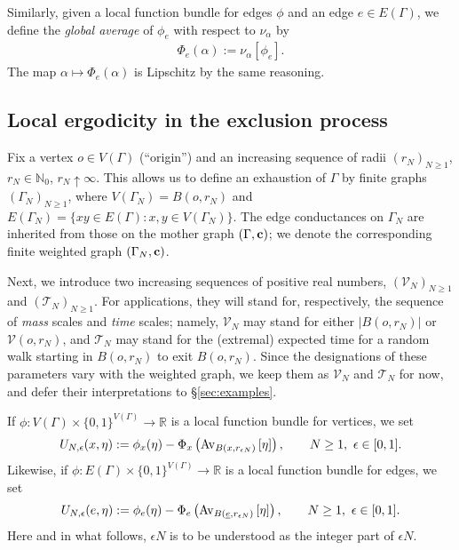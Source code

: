 \documentclass[11pt]{amsart}
\theoremstyle{plain}
\theoremstyle{definition}
\theoremstyle{remark}
\begin{document}
Similarly, given a local function bundle for edges $\phi$ and an edge $e\in E(\Gamma)$, we define the \emph{global average} of $\phi_e$ with respect to $\nu_\alpha$ by
\begin{align}
\Phi_e(\alpha) := \nu_\alpha[\phi_e].
\end{align}
The map $\alpha \mapsto \Phi_e(\alpha)$ is Lipschitz by the same reasoning.

\subsection{Local ergodicity in the exclusion process} \label{sec:superexp}

Fix a vertex $o\in V(\Gamma)$ (``origin'') and an increasing sequence of radii $(r_N)_{N\geq 1}$, $r_N \in \mathbb{N}_0$,  $r_N \uparrow \infty$. This allows us to define an exhaustion of $\Gamma$ by finite graphs $(\Gamma_N)_{N\geq 1}$, where $V(\Gamma_N)= B(o,r_N)$ and $E(\Gamma_N) = \{xy\in E(\Gamma): x, y \in V(\Gamma_N)\}$. The edge conductances on $\Gamma_N$ are inherited from those on the mother graph $(\Gamma, {\bf c})$; we denote the corresponding finite weighted graph $(\Gamma_N, {\bf c})$.

Next, we introduce two increasing sequences of positive real numbers, $(\mathcal{V}_N)_{N\geq 1}$ and $(\mathcal{T}_N)_{N\geq 1}$. For applications, they will stand for, respectively, the sequence of \emph{mass} scales and \emph{time} scales; namely, $\mathcal{V}_N$ may stand for either $|B(o,r_N)|$ or $\mathcal{V}(o,r_N)$, and $\mathcal{T}_N$ may stand for the (extremal) expected time for a random walk starting in $B(o,r_N)$
to exit $B(o,r_N)$. Since the designations of these parameters vary with the weighted graph, we keep them as $\mathcal{V}_N$ and $\mathcal{T}_N$ for now, and defer their interpretations to \S\ref{sec:examples}. 

If $\phi: V(\Gamma)\times \{0,1\}^{V(\Gamma)}\to\mathbb{R}$ is a local function bundle for vertices, we set
\begin{align}
\label{eq:UNE}
U_{N,\epsilon}(x,\eta) := \phi_x(\eta)-  \Phi_x\left({{\rm Av}_{{B(x,r_{\epsilon N})}}\left[{{\eta}}\right]}\right), \qquad N\geq 1,~\epsilon\in [0,1].
\end{align}
Likewise, if $\phi: E(\Gamma)\times\{0,1\}^{V(\Gamma)}\to \mathbb{R}$ is a local function bundle for edges, we set
\begin{align}
\label{eq:UNE2}
U_{N,\epsilon}(e,\eta) := \phi_e(\eta)-  \Phi_e\left({{\rm Av}_{{B(\underline{e},r_{\epsilon N})}}\left[{{\eta}}\right]}\right), \qquad N\geq 1,~\epsilon\in [0,1].
\end{align}
Here and in what follows, $\epsilon N$ is to be understood as the integer part of $\epsilon N$.
\end{document}
